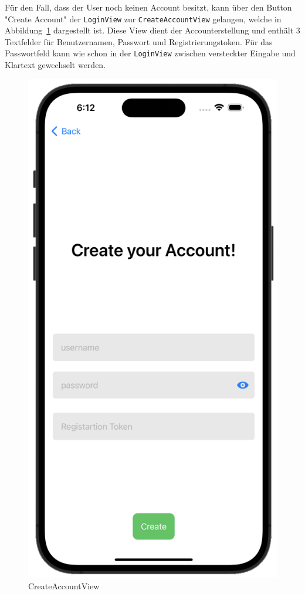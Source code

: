     Für den Fall, dass der User noch keinen Account besitzt, kann über den Button "Create Account" der \texttt{LoginView} zur \texttt{CreateAccountView} gelangen, welche in Abbildung~\ref{fig:createaccountview} dargestellt ist.
    Diese View dient der Accounterstellung und enthält 3 Textfelder für Benutzernamen, Passwort und Registrierungstoken.
    Für das Passwortfeld kann wie schon in der \texttt{LoginView} zwischen versteckter Eingabe und Klartext gewechselt werden.
    \begin{figure}[h]
        \includegraphics[scale=0.5]{accountcreate_white}
        \centering
        \caption{CreateAccountView}\label{fig:createaccountview}
    \end{figure}
